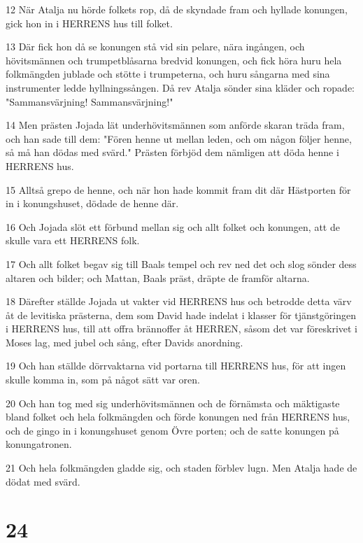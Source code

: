 \par 12 När Atalja nu hörde folkets rop, då de skyndade fram och hyllade konungen, gick hon in i HERRENS hus till folket.
\par 13 Där fick hon då se konungen stå vid sin pelare, nära ingången, och hövitsmännen och trumpetblåsarna bredvid konungen, och fick höra huru hela folkmängden jublade och stötte i trumpeterna, och huru sångarna med sina instrumenter ledde hyllningssången. Då rev Atalja sönder sina kläder och ropade: "Sammansvärjning! Sammansvärjning!"
\par 14 Men prästen Jojada lät underhövitsmännen som anförde skaran träda fram, och han sade till dem: "Fören henne ut mellan leden, och om någon följer henne, så må han dödas med svärd." Prästen förbjöd dem nämligen att döda henne i HERRENS hus.
\par 15 Alltså grepo de henne, och när hon hade kommit fram dit där Hästporten för in i konungshuset, dödade de henne där.
\par 16 Och Jojada slöt ett förbund mellan sig och allt folket och konungen, att de skulle vara ett HERRENS folk.
\par 17 Och allt folket begav sig till Baals tempel och rev ned det och slog sönder dess altaren och bilder; och Mattan, Baals präst, dräpte de framför altarna.
\par 18 Därefter ställde Jojada ut vakter vid HERRENS hus och betrodde detta värv åt de levitiska prästerna, dem som David hade indelat i klasser för tjänstgöringen i HERRENS hus, till att offra brännoffer åt HERREN, såsom det var föreskrivet i Moses lag, med jubel och sång, efter Davids anordning.
\par 19 Och han ställde dörrvaktarna vid portarna till HERRENS hus, för att ingen skulle komma in, som på något sätt var oren.
\par 20 Och han tog med sig underhövitsmännen och de förnämsta och mäktigaste bland folket och hela folkmängden och förde konungen ned från HERRENS hus, och de gingo in i konungshuset genom Övre porten; och de satte konungen på konungatronen.
\par 21 Och hela folkmängden gladde sig, och staden förblev lugn. Men Atalja hade de dödat med svärd.

\chapter{24}

